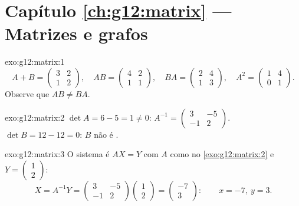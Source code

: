 \section*{Capítulo \ref{ch:g12:matrix} --- Matrizes e grafos}

\begin{solution}{exo:g12:matrix:1}
\[
A + B = \begin{pmatrix} 3 & 2\\ 1 & 2\end{pmatrix}, \quad
AB = \begin{pmatrix} 4 & 2\\ 1 & 1\end{pmatrix}, \quad
BA = \begin{pmatrix} 2 & 4\\ 1 & 3\end{pmatrix}, \quad
A^2 = \begin{pmatrix} 1 & 4\\ 0 & 1\end{pmatrix}.
\]
Observe que $AB \neq BA$.
\end{solution}

\begin{solution}{exo:g12:matrix:2}
$\det A = 6 - 5 = 1 \neq 0$:
$A^{-1} = \begin{pmatrix} 3 & -5\\ -1 & 2 \end{pmatrix}$.
$\det B = 12 - 12 = 0$: $B$ não é .
\end{solution}

\begin{solution}{exo:g12:matrix:3}
O sistema é $AX = Y$ com $A$ como no \cref{exo:g12:matrix:2} e
$Y = \begin{pmatrix} 1\\ 2\end{pmatrix}$:
\[
X = A^{-1}Y = \begin{pmatrix} 3 & -5\\ -1 & 2\end{pmatrix}
\begin{pmatrix} 1\\ 2\end{pmatrix}
= \begin{pmatrix} -7\\ 3\end{pmatrix}:
\qquad x = -7,\ y = 3 .
\]
\end{solution}

